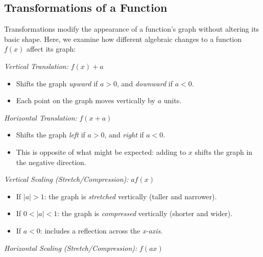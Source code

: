 \subsection{Transformations of a Function}

Transformations modify the appearance of a function's graph without altering its basic shape.
Here, we examine how different algebraic changes to a function \( f(x) \) affect its graph:
\vspace{\baselineskip}

\emph{Vertical Translation:} \( f(x) + a \)
	    
\begin{itemize}
	
	\item Shifts the graph \emph{upward} if \( a > 0 \), and \emph{downward} if \( a < 0 \).
	
	\item Each point on the graph moves vertically by \(a\) units.

\end{itemize}

\emph{Horizontal Translation:} \( f(x + a) \)

\begin{itemize}

	\item Shifts the graph \emph{left} if \( a > 0 \), and \emph{right} if \( a < 0 \).

	\item This is opposite of what might be expected: adding to \(x\) shifts the graph in the negative 
	      direction.

\end{itemize}

\emph{Vertical Scaling (Stretch/Compression):} \( a f(x) \)

\begin{itemize}
	
	\item If \( |a| > 1 \): the graph is \emph{stretched} vertically (taller and narrower).
	
	\item If \( 0 < |a| < 1 \): the graph is \emph{compressed} vertically (shorter and wider).
	
	\item If \( a < 0 \): includes a reflection across the \emph{x-axis}.

\end{itemize}

\emph{Horizontal Scaling (Stretch/Compression):} \( f(a x) \)

